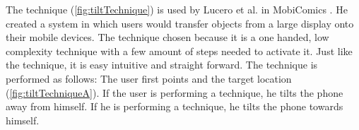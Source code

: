 \begin{figure}[H]
	\label{fig:throwTechnique}
\end{figure}

The \tilt technique (\cref{fig:tiltTechnique}) is used by Lucero et al. in MobiComics \cite{Lucero:2012}.
He created a system in which users would transfer objects from a large display onto their mobile devices.
The \throw technique chosen because it is a one handed, low complexity technique with a few amount of steps needed to activate it. 
Just like the \swipe technique, it is easy intuitive and straight forward. 
The \tilt technique is performed as follows:
The user first points and the target location (\cref{fig:tiltTechniqueA}).
If the user is performing a \push technique, he tilts the phone away from himself.
If he is performing a \pull technique, he tilts the phone towards himself. 

